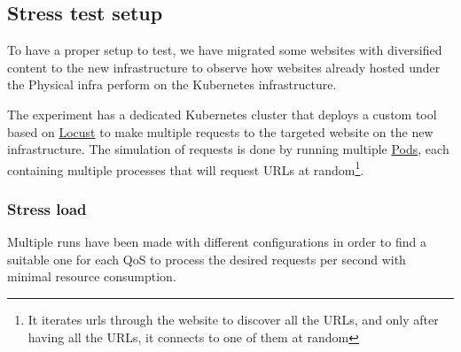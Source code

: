 


\subsection{Stress test setup}

To have a proper setup to test, we have migrated some websites with diversified content to the new infrastructure to observe how websites already hosted under the Physical infra perform on the Kubernetes infrastructure.



The experiment has a dedicated Kubernetes cluster that deploys a custom tool based on \hyperlink{locust.io}{Locust} to make multiple requests to the targeted website on the new infrastructure. 
The simulation of requests is done by running multiple \hyperlink{https://kubernetes.io/docs/concepts/workloads/pods/}{Pods}, each containing multiple processes that will request URLs at random\footnote{It iterates urls through the website to discover all the URLs, and only after having all the URLs, it connects to one of them at random}.

\subsubsection{Stress load}
Multiple runs have been made with different configurations in order to find a suitable one for each QoS to process the desired requests per second with minimal resource consumption.

